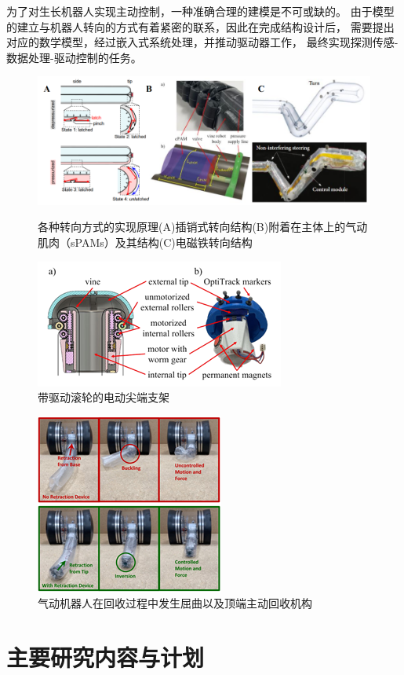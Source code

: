 \documentclass[11pt, a4paper, oneside]{ctexart}
\begin{document}
为了对生长机器人实现主动控制，一种准确合理的建模是不可或缺的。
由于模型的建立与机器人转向的方式有着紧密的联系，因此在完成结构设计后，
需要提出对应的数学模型，经过嵌入式系统处理，并推动驱动器工作，
最终实现探测传感-数据处理-驱动控制的任务。

\begin{figure}[h]
    \centering
    \includegraphics[scale=0.8]{fig2}
    \caption{各种转向方式的实现原理(A)插销式转向结构(B)附着在主体上的气动肌肉（sPAMs）及其结构(C)电磁铁转向结构}
    \label{fig-2}

    \includegraphics[scale=1.1]{fig3}
    \caption{带驱动滚轮的电动尖端支架}
    \label{fig-3}
\end{figure}

\begin{figure}
    \centering
    \includegraphics[scale=1.2]{fig4}
    \caption{气动机器人在回收过程中发生屈曲以及顶端主动回收机构}
    \label{fig-4}
\end{figure}
    
\section{主要研究内容与计划}
\end{document}
